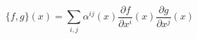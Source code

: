 \begin{equation}
    \label{eq:LocalPoisson}
    \{f, g\} (x) = 
    \sum_{i,j} \alpha^{ij}(x) 
    \frac{\partial f}{\partial x^i}(x)
    \frac{\partial g}{\partial x^j}(x)
\end{equation}

